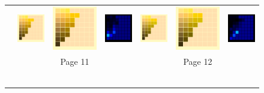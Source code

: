 \begin{figure}[t!]
{\begin{tabular}{ccccccc}
			\\ \raisebox{0.5cm}[0pt][0pt]{\parbox[c][0pt][c]{0cm}{\hspace{-1.5em}\\[20pt]}\par}
			&
			\includegraphics[width=.155\linewidth]{img/results_uplift_page11_originalFL11.png}
			&
			\includegraphics[width=.155\linewidth]{img/results_uplift_page11_ourFL11.png}
			& 
			\includegraphics[width=.155\linewidth]{img/results_uplift_page11_diff_ourFL11.png}
			&\quad
			\includegraphics[width=.155\linewidth]{img/results_uplift_page12_originalFL11.png}
			&
			\includegraphics[width=.155\linewidth]{img/results_uplift_page12_ourFL11.png}
			&
			\includegraphics[width=.155\linewidth]{img/results_uplift_page12_diff_ourFL11.png}\\
			& & Page 11 & & & Page 12 & \\
			\vspace{0.1em} \\ 
			\raisebox{0.4cm}[0pt][0pt]{\parbox[c][0pt][c]{0cm}{\hspace{-1.5em}\\[20pt]}\par}

\end{tabular}}
\end{figure}
